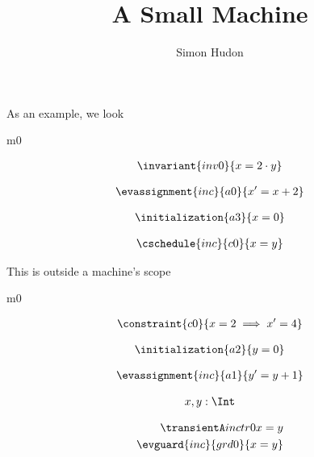 \documentclass[12pt]{amsart}
\title{A Small Machine}
\author{Simon Hudon}
\date{} %
\begin{document}
\maketitle

As an example, we look

\begin{machine}{m0}


\begin{align*}
\invariant{inv0}
{	x = 2 \cdot y	}
\end{align*}

\begin{align*}
\evassignment{inc}{a0}
{	x' = x + 2	}
\end{align*}

\begin{align*}
\initialization{a3}
{	x = 0	}
\end{align*}


\begin{align*}
\cschedule{inc}{c0}
{	x = y	}
\end{align*}

\end{machine}

This is outside a machine's scope

\begin{machine}{m0}

\begin{align*}
\constraint{c0}
{	x = 2 \implies x' = 4	}
\end{align*}

\begin{align*}
\initialization{a2}
{	y = 0	}
\end{align*}

\begin{align*}
\evassignment{inc}{a1}
{	y' = y + 1	}
\end{align*}

\begin{align*}
\variable{	x,y: \Int}
\end{align*}

\begin{align*}
\transient{inc}{0}{tr0}
{	x = y	} \\
\evguard{inc}{grd0}
{	x = y }
\end{align*}

\end{machine}
\end{document}
